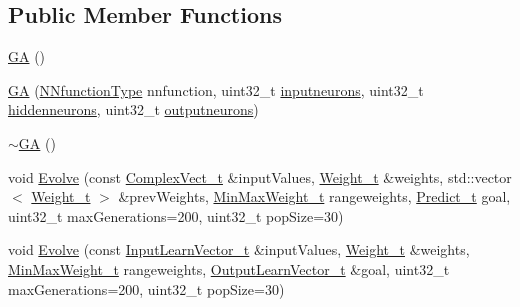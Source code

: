 \subsection*{Public Member Functions}
\begin{DoxyCompactItemize}
\item 
\hyperlink{class_soil_math_1_1_g_a_a759b77fbe44fa1d5df5bcbdee9d97c4e}{G\+A} ()
\item 
\hyperlink{class_soil_math_1_1_g_a_a6fed498b99290a5218cc3ecd9537fc74}{G\+A} (\hyperlink{_soil_math_types_8h_a7791f1b8f92a964847637c5d657c1b10}{N\+Nfunction\+Type} nnfunction, uint32\+\_\+t \hyperlink{class_soil_math_1_1_g_a_ac32591e30dde5ac854ae57a7b9e33298}{inputneurons}, uint32\+\_\+t \hyperlink{class_soil_math_1_1_g_a_a3f1eee7492f68a05b9b06ee8afb2ec20}{hiddenneurons}, uint32\+\_\+t \hyperlink{class_soil_math_1_1_g_a_ab454f9968d5ce2a294b89f85c9d3a74f}{outputneurons})
\item 
\hyperlink{class_soil_math_1_1_g_a_a7a7087b2c5a268a1a9bccc04600537f6}{$\sim$\+G\+A} ()
\item 
void \hyperlink{class_soil_math_1_1_g_a_a4290310d89064946c645673840591540}{Evolve} (const \hyperlink{_soil_math_types_8h_a7567e521c2b2c408dcb62dbff72390f7}{Complex\+Vect\+\_\+t} \&input\+Values, \hyperlink{_soil_math_types_8h_ac56ad2b88186620fd0de0d213aa715dd}{Weight\+\_\+t} \&weights, std\+::vector$<$ \hyperlink{_soil_math_types_8h_ac56ad2b88186620fd0de0d213aa715dd}{Weight\+\_\+t} $>$ \&prev\+Weights, \hyperlink{_soil_math_types_8h_aaa919636507bcd52b19efa301aa80b9a}{Min\+Max\+Weight\+\_\+t} rangeweights, \hyperlink{_soil_math_types_8h_aaeba766195a440b2539f0438d3d41f95}{Predict\+\_\+t} goal, uint32\+\_\+t max\+Generations=200, uint32\+\_\+t pop\+Size=30)
\item 
void \hyperlink{class_soil_math_1_1_g_a_aca448f36c1f98b4906d0754cf354cccf}{Evolve} (const \hyperlink{_soil_math_types_8h_a45aa81992bf0ddf272907bd4fa0b96cf}{Input\+Learn\+Vector\+\_\+t} \&input\+Values, \hyperlink{_soil_math_types_8h_ac56ad2b88186620fd0de0d213aa715dd}{Weight\+\_\+t} \&weights, \hyperlink{_soil_math_types_8h_aaa919636507bcd52b19efa301aa80b9a}{Min\+Max\+Weight\+\_\+t} rangeweights, \hyperlink{_soil_math_types_8h_a2d8b5a261688166d724b68addd8561e6}{Output\+Learn\+Vector\+\_\+t} \&goal, uint32\+\_\+t max\+Generations=200, uint32\+\_\+t pop\+Size=30)
\end{DoxyCompactItemize}
